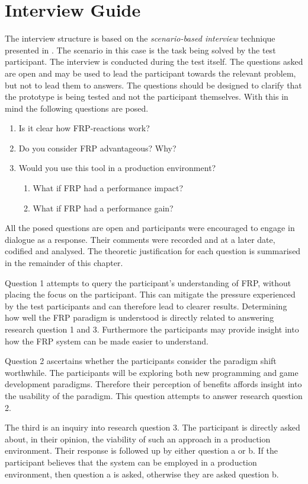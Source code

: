 \chapter{Interview Guide}
The interview structure is based on the \textit{scenario-based interview} technique presented in \cite{blackwell2004champagne}. The scenario in this case is the task being solved by the test participant. The interview is conducted during the test itself. The questions asked are open and may be used to lead the participant towards the relevant problem, but not to lead them to answers. The questions should be designed to clarify that the prototype is being tested and not the participant themselves. With this in mind the following questions are posed.

\begin{enumerate}
  \item Is it clear how \gls{FRP}-reactions work?
  \item Do you consider \gls{FRP} advantageous? Why?
  \item Would you use this tool in a production environment?
  \begin{enumerate}
    \item What if \gls{FRP} had a performance impact?
    \item What if \gls{FRP} had a performance gain?
  \end{enumerate}
\end{enumerate}

All the posed questions are open and participants were encouraged to engage in dialogue as a response. Their comments were recorded and at a later date, codified and analysed. The theoretic justification for each question is summarised in the remainder of this chapter.

Question 1 attempts to query the participant's understanding of \gls{FRP}, without placing the focus on the participant. This can mitigate the pressure experienced by the test participants and can therefore lead to clearer results. Determining how well the \gls{FRP} paradigm is understood is directly related to answering research question 1 and 3. Furthermore the participants may provide insight into how the \gls{FRP} system can be made easier to understand.

Question 2 ascertains whether the participants consider the paradigm shift worthwhile. The participants will be exploring both new programming and game development paradigms. Therefore their perception of benefits affords insight into the usability of the paradigm. This question attempts to answer research question 2.

The third is an inquiry into research question 3. The participant is directly asked about, in their opinion, the viability of such an approach in a production environment. Their response is followed up by either question a or b. If the participant believes that the system can be employed in a production environment, then question a is asked, otherwise they are asked question b.
